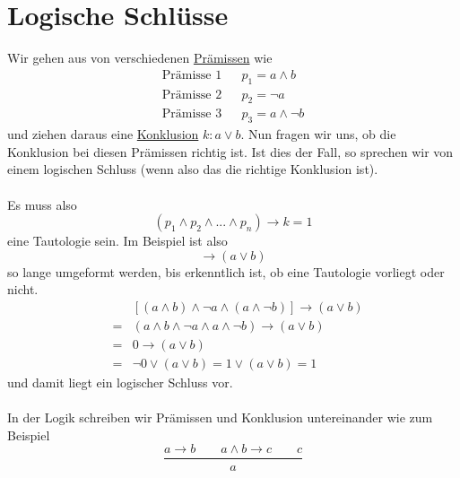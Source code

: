 \documentclass{report}
\begin{document}
\section{Logische Schlüsse}
Wir gehen aus von verschiedenen \underline{Prämissen} wie
\begin{eqnarray}\mbox{Prämisse 1} & & p_1 = a \land b \nonumber \\
\mbox{Prämisse 2}& & p_2 = \lnot a \nonumber \\
\mbox{Prämisse 3}& & p_3 = a \land \lnot b\end{eqnarray}
und ziehen daraus eine \underline{Konklusion} $k : a \lor b$. Nun fragen wir uns, ob die Konklusion bei diesen Prämissen richtig ist. Ist dies der Fall, so sprechen wir von einem logischen Schluss (wenn also das die richtige Konklusion ist).
\\\\Es muss also
\begin{equation}(p_1 \land p_2 \land ... \land p_n) \to k = 1\end{equation}
eine Tautologie sein. Im Beispiel ist also
\begin{equation}[(a \land b) \land \lnot a \land (a \land \lnot b)] \to (a \lor b)\end{equation}
so lange umgeformt werden, bis erkenntlich ist, ob eine Tautologie vorliegt oder nicht.
\begin{eqnarray}& &[(a \land b) \land \lnot a \land (a \land \lnot b)] \to (a \lor b) \nonumber \\
&=&(a \land b \land \lnot a \land a \land \lnot b) \to (a \lor b) \nonumber \\
&=&0 \to (a \lor b) \nonumber \\
&=&\lnot 0 \lor (a \lor b) = 1 \lor (a \lor b) = 1\end{eqnarray}
und damit liegt ein logischer Schluss vor.\\\\
In der Logik schreiben wir Prämissen und Konklusion untereinander wie zum Beispiel
\begin{equation}\frac{a \to b \quad\quad a \land b \to c \quad\quad c}{a}\end{equation}
\end{document}
